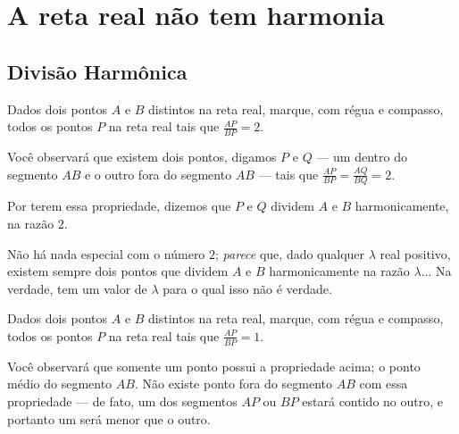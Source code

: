 \chapter{A reta real não tem harmonia}

\section{Divisão Harmônica}

\begin{exer}
  Dados dois pontos \(A\) e \(B\) distintos na reta real, marque, com régua e compasso, todos os pontos \(P\) na reta real tais que \(\frac{AP}{BP} = 2\).
\end{exer}

Você observará que existem dois pontos, digamos \(P\) e \(Q\) --- um dentro do segmento \(AB\) e o outro fora do segmento \(AB\) ---  tais que \(\frac{AP}{BP} = \frac{AQ}{BQ} = 2\).

Por terem essa propriedade, dizemos que \(P\) e \(Q\) dividem \(A\) e \(B\) harmonicamente, na razão \(2\).


Não há nada especial com o número \(2\); \emph{parece} que, dado qualquer \(\lambda\) real positivo, existem sempre dois pontos que dividem \(A\) e \(B\) harmonicamente na razão \(\lambda\)...
Na verdade, tem um valor de \(\lambda\) para o qual isso não é verdade.

\begin{exer}
  Dados dois pontos \(A\) e \(B\) distintos na reta real, marque, com régua e compasso, todos os pontos \(P\) na reta real tais que \(\frac{AP}{BP} = 1\).
\end{exer}

Você observará que somente um ponto possui a propriedade acima; o ponto médio do segmento \(AB\).
Não existe ponto fora do segmento \(AB\) com essa propriedade --- de fato, um dos segmentos \(AP\) ou \(BP\) estará contido no outro, e portanto um será menor que o outro.

